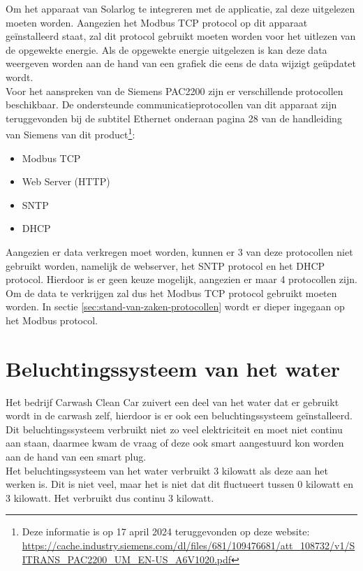 Om het apparaat van Solarlog te integreren met de applicatie, zal deze uitgelezen moeten worden. Aangezien het Modbus TCP protocol op dit apparaat geïnstalleerd staat, zal dit protocol gebruikt moeten worden voor het uitlezen van de opgewekte energie. Als de opgewekte energie uitgelezen is kan deze data weergeven worden aan de hand van een grafiek die eens de data wijzigt geüpdatet wordt.\\

Voor het aanspreken van de Siemens PAC2200 zijn er verschillende protocollen beschikbaar. De ondersteunde communicatieprotocollen van dit apparaat zijn teruggevonden bij de subtitel Ethernet onderaan pagina 28 van de handleiding van Siemens van dit product\footnote{Deze informatie is op 17 april 2024 teruggevonden op deze website: \url{https://cache.industry.siemens.com/dl/files/681/109476681/att_108732/v1/SITRANS_PAC2200_UM_EN-US_A6V1020.pdf}}:

\begin{itemize}
    \item Modbus TCP
    \item Web Server (HTTP)
    \item SNTP
    \item DHCP
\end{itemize}

Aangezien er data verkregen moet worden, kunnen er 3 van deze protocollen niet gebruikt worden, namelijk de webserver, het SNTP protocol en het DHCP protocol. Hierdoor is er geen keuze mogelijk, aangezien er maar 4 protocollen zijn. Om de data te verkrijgen zal dus het Modbus TCP protocol gebruikt moeten worden. In sectie \ref{sec:stand-van-zaken-protocollen} wordt er dieper ingegaan op het Modbus protocol.

\section{Beluchtingssysteem van het water}
\label{sec:stand-van-zaken-beluchtingssysteem}

Het bedrijf Carwash Clean Car zuivert een deel van het water dat er gebruikt wordt in de carwash zelf, hierdoor is er ook een beluchtingssysteem geïnstalleerd. Dit beluchtingssysteem verbruikt niet zo veel elektriciteit en moet niet continu aan staan, daarmee kwam de vraag of deze ook smart aangestuurd kon worden aan de hand van een smart plug.\\

Het beluchtingssysteem van het water verbruikt 3 kilowatt als deze aan het werken is. Dit is niet veel, maar het is niet dat dit fluctueert tussen 0 kilowatt en 3 kilowatt. Het verbruikt dus continu 3 kilowatt.\\

